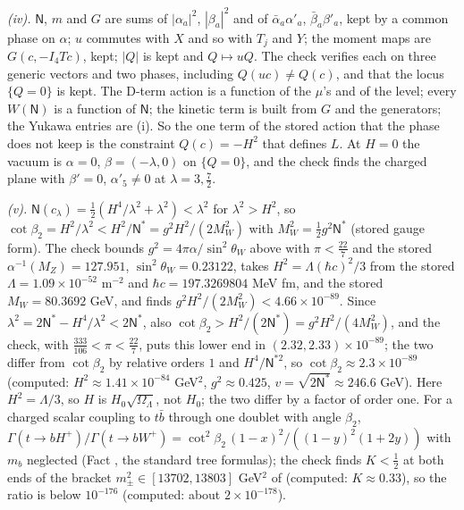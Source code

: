 \emph{(iv).} $\mathsf{N}$, $m$ and $G$ are sums of $|\alpha_{a}|^{2}$, $|\beta_{a}|^{2}$ and of $\bar{\alpha}_{a}\alpha'_{a}$, $\bar{\beta}_{a}\beta'_{a}$, kept by a common phase on $\alpha$; $u$ commutes with $X$ and so with $T_{j}$ and $Y$; the moment maps are $G(c, -I_{4}T c)$, kept; $|Q|$ is kept and $Q \mapsto uQ$. The check verifies each on three generic vectors and two phases, including $Q(uc) \ne Q(c)$, and that the locus $\{Q = 0\}$ is kept. The D-term action is a function of the $\mu$'s and of the level; every $W(\mathsf{N})$ is a function of $\mathsf{N}$; the kinetic term is built from $G$ and the generators; the Yukawa entries are (i). So the one term of the stored action that the phase does not keep is the constraint $Q(c) = -H^{2}$ that defines $L$. At $H = 0$ the vacuum is $\alpha = 0$, $\beta = (-\lambda, 0)$ on $\{Q = 0\}$, and the check finds the charged plane with $\beta' = 0$, $\alpha'_{5} \ne 0$ at $\lambda = 3, \tfrac72$.

\emph{(v).} $\mathsf{N}(c_{\lambda}) = \tfrac12(H^{4}/\lambda^{2} + \lambda^{2}) < \lambda^{2}$ for $\lambda^{2} > H^{2}$, so $\cot\beta_{2} = H^{2}/\lambda^{2} < H^{2}/\mathsf{N}^{*} = g^{2}H^{2}/(2M_{W}^{2})$ with $M_{W}^{2} = \tfrac12 g^{2}\mathsf{N}^{*}$ (stored gauge form). The check bounds $g^{2} = 4\pi\alpha/\sin^{2}\theta_{W}$ above with $\pi < \tfrac{22}{7}$ and the stored $\alpha^{-1}(M_{Z}) = 127.951$, $\sin^{2}\theta_{W} = 0.23122$, takes $H^{2} = \Lambda(\hbar c)^{2}/3$ from the stored $\Lambda = 1.09 \times 10^{-52}$ m$^{-2}$ and $\hbar c = 197.3269804$ MeV fm, and the stored $M_{W} = 80.3692$ GeV, and finds $g^{2}H^{2}/(2M_{W}^{2}) < 4.66 \times 10^{-89}$. Since $\lambda^{2} = 2\mathsf{N}^{*} - H^{4}/\lambda^{2} < 2\mathsf{N}^{*}$, also $\cot\beta_{2} > H^{2}/(2\mathsf{N}^{*}) = g^{2}H^{2}/(4M_{W}^{2})$, and the check, with $\tfrac{333}{106} < \pi < \tfrac{22}{7}$, puts this lower end in $(2.32, 2.33) \times 10^{-89}$; the two differ from $\cot\beta_{2}$ by relative orders $1$ and $H^{4}/\mathsf{N}^{*2}$, so $\cot\beta_{2} \approx 2.3 \times 10^{-89}$ (computed: $H^{2} \approx 1.41 \times 10^{-84}$ GeV$^{2}$, $g^{2} \approx 0.425$, $v = \sqrt{2\mathsf{N}^{*}} \approx 246.6$ GeV). Here $H^{2} = \Lambda/3$, so $H$ is $H_{0}\sqrt{\Omega_{\Lambda}}$, not $H_{0}$; the two differ by a factor of order one. For a charged scalar coupling to $t\bar{b}$ through one doublet with angle $\beta_{2}$, $\Gamma(t \to bH^{+})/\Gamma(t \to bW^{+}) = \cot^{2}\beta_{2}\,(1 - x)^{2}/((1 - y)^{2}(1 + 2y))$ with $m_{b}$ neglected (Fact , the standard tree formulas); the check finds $K < \tfrac12$ at both ends of the bracket $m_{\pm}^{2} \in [13702, 13803]$ GeV$^{2}$ of  (computed: $K \approx 0.33$), so the ratio is below $10^{-176}$ (computed: about $2 \times 10^{-178}$).

